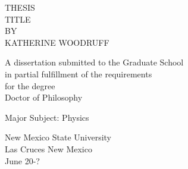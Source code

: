 \thispagestyle{empty}
\renewcommand{\baselinestretch}{2}
\begin{center}
THESIS\\  TITLE\\
\vspace{0.1in}
BY\\
\vspace{0.1in}
KATHERINE WOODRUFF
\end{center}
\vspace{1.0in}
\begin{center}
A dissertation submitted to the Graduate School\\
\vspace{0.1in}
in partial fulfillment of the requirements\\
\vspace{0.1in}
for the degree \\
\vspace{0.1in}
Doctor of Philosophy
\end{center}
\vfill
\begin{center}
Major Subject: Physics
\end{center}
\vspace{1.0in}
\begin{center}
New Mexico State University\\
\vspace{0.1in}
Las Cruces New Mexico\\
\vspace{0.1in}
June 20-?
\end{center}
\newpage
